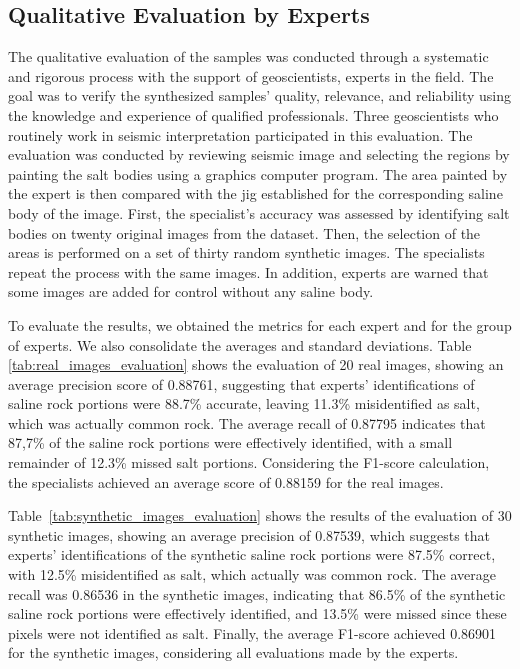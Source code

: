 \documentclass{ieeeaccess}
\begin{document}
\subsection{Qualitative Evaluation by Experts}

The qualitative evaluation of the samples was conducted through a systematic and rigorous process with the support of geoscientists, experts in the field. The goal was to verify the synthesized samples' quality, relevance, and reliability using the knowledge and experience of qualified professionals. Three geoscientists who routinely work in seismic interpretation participated in this evaluation. The evaluation was conducted by reviewing seismic image and selecting the regions by painting the salt bodies using a graphics computer program. The area painted by the expert is then compared with the jig established for the corresponding saline body of the image. First, the specialist's accuracy was assessed by identifying salt bodies on twenty original images from the dataset. Then, the selection of the areas is performed on a set of thirty random synthetic images. The specialists repeat the process with the same images. In addition, experts are warned that some images are added for control without any saline body.

To evaluate the results, we obtained the metrics for each expert and for the group of experts. We also consolidate the averages and standard deviations. Table \ref{tab:real_images_evaluation} shows the evaluation of 20 real images, showing an average precision score of 0.88761, suggesting that experts' identifications of saline rock portions were 88.7\% accurate, leaving 11.3\% misidentified as salt, which was actually common rock. The average recall of 0.87795 indicates that 87,7\% of the saline rock portions were effectively identified, with a small remainder of 12.3\% missed salt portions. Considering the F1-score calculation, the specialists achieved an average score of 0.88159 for the real images.

Table~\ref{tab:synthetic_images_evaluation} shows the results of the evaluation of 30 synthetic images, showing an average precision of 0.87539, which suggests that experts' identifications of the synthetic saline rock portions were 87.5\% correct, with 12.5\% misidentified as salt, which actually was common rock. The average recall was 0.86536 in the synthetic images, indicating that 86.5\% of the synthetic saline rock portions were effectively identified, and 13.5\% were missed since these pixels were not identified as salt. Finally, the average F1-score achieved 0.86901 for the synthetic images, considering all evaluations made by the experts.
\end{document}
